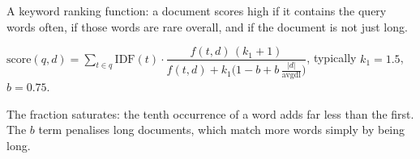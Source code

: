 \documentclass[11pt,a4paper]{article}
\begin{document}

\begin{bdef}[BM25]
A keyword ranking function: a document scores high if it contains the query words often, if those words are rare overall, and if the document is not just long.
\end{bdef}
\begin{bmath}[BM25 score]
$\mathrm{score}(q,d)=\sum_{t\in q}\mathrm{IDF}(t)\cdot\dfrac{f(t,d)\,(k_1+1)}{f(t,d)+k_1\big(1-b+b\,\frac{|d|}{\mathrm{avgdl}}\big)}$, \quad typically $k_1=1.5$, $b=0.75$.
\end{bmath}
The fraction saturates: the tenth occurrence of a word adds far less than the first. The $b$ term penalises long documents, which match more words simply by being long.
\end{document}
